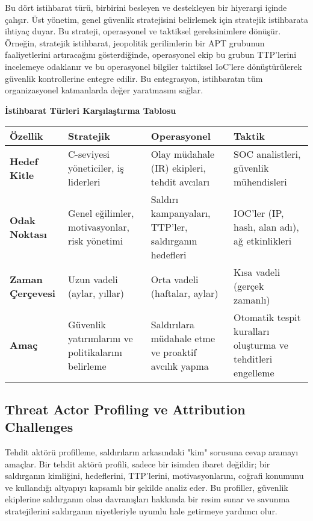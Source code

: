 Bu dört istihbarat türü, birbirini besleyen ve destekleyen bir hiyerarşi içinde çalışır. Üst yönetim, genel güvenlik stratejisini belirlemek için stratejik istihbarata ihtiyaç duyar. Bu strateji, operasyonel ve taktiksel gereksinimlere dönüşür. Örneğin, stratejik istihbarat, jeopolitik gerilimlerin bir APT grubunun faaliyetlerini artıracağını gösterdiğinde, operasyonel ekip bu grubun TTP'lerini incelemeye odaklanır ve bu operasyonel bilgiler taktiksel IoC'lere dönüştürülerek güvenlik kontrollerine entegre edilir. Bu entegrasyon, istihbaratın tüm organizasyonel katmanlarda değer yaratmasını sağlar.

\textbf{İstihbarat Türleri Karşılaştırma Tablosu}

\begin{tabularx}{\textwidth}{|l|X|X|X|}
\hline
\textbf{Özellik} & \textbf{Stratejik} & \textbf{Operasyonel} & \textbf{Taktik} \\
\hline
\textbf{Hedef Kitle} & C-seviyesi yöneticiler, iş liderleri & Olay müdahale (IR) ekipleri, tehdit avcıları & SOC analistleri, güvenlik mühendisleri \\
\hline
\textbf{Odak Noktası} & Genel eğilimler, motivasyonlar, risk yönetimi & Saldırı kampanyaları, TTP'ler, saldırganın hedefleri & IOC'ler (IP, hash, alan adı), ağ etkinlikleri \\
\hline
\textbf{Zaman Çerçevesi} & Uzun vadeli (aylar, yıllar) & Orta vadeli (haftalar, aylar) & Kısa vadeli (gerçek zamanlı) \\
\hline
\textbf{Amaç} & Güvenlik yatırımlarını ve politikalarını belirleme & Saldırılara müdahale etme ve proaktif avcılık yapma & Otomatik tespit kuralları oluşturma ve tehditleri engelleme \\
\hline
\end{tabularx}

\subsection{Threat Actor Profiling ve Attribution Challenges}

Tehdit aktörü profilleme, saldırıların arkasındaki "kim" sorusuna cevap aramayı amaçlar. Bir tehdit aktörü profili, sadece bir isimden ibaret değildir; bir saldırganın kimliğini, hedeflerini, TTP'lerini, motivasyonlarını, coğrafi konumunu ve kullandığı altyapıyı kapsamlı bir şekilde analiz eder. Bu profiller, güvenlik ekiplerine saldırganın olası davranışları hakkında bir resim sunar ve savunma stratejilerini saldırganın niyetleriyle uyumlu hale getirmeye yardımcı olur.

